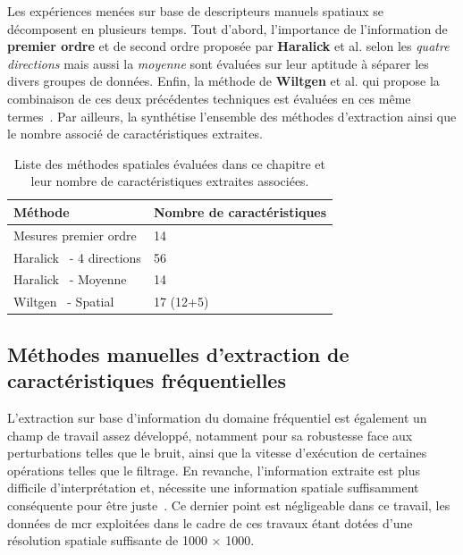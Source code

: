 Les expériences menées sur base de descripteurs manuels spatiaux se décomposent en plusieurs temps. Tout d'abord, l'importance de l'information de \textbf{premier ordre} et de second ordre proposée par \textbf{Haralick} et al. selon les \textit{quatre directions} mais aussi la \textit{moyenne} sont évaluées sur leur aptitude à séparer les divers groupes de données. Enfin, la méthode de \textbf{Wiltgen} et al. qui propose la combinaison de ces deux précédentes techniques est évaluées en ces même termes~\cite{Wiltgen2008}. Par ailleurs, la  synthétise l'ensemble des méthodes d'extraction ainsi que le nombre associé de caractéristiques extraites.\par
\begin{table}[h]
    \centering
    \begin{tabular}{ll}
        \toprule
        \textbf{Méthode}                            & \textbf{Nombre de caractéristiques}   \\ \hline
        Mesures premier ordre                       & 14                                    \\ \hline
        Haralick~\cite{Haralick1973} - 4 directions & 56                                    \\ \hline
        Haralick~\cite{Haralick1973} - Moyenne      & 14                                    \\ \hline
        Wiltgen~\cite{Wiltgen2008} - Spatial        & 17 (12+5)                             \\
        \bottomrule                 
    \end{tabular}
    \caption{Liste des méthodes spatiales évaluées dans ce chapitre et leur nombre de caractéristiques extraites associées.}
    \label{tab:number_features_spatial}
\end{table}
\clearpage

\subsection{Méthodes manuelles d'extraction de caractéristiques fréquentielles}
L'extraction sur base d'information du domaine fréquentiel est également un champ de travail assez développé, notamment pour sa robustesse face aux perturbations telles que le bruit, ainsi que la vitesse d'exécution de certaines opérations telles que le filtrage. En revanche, l'information extraite est plus difficile d'interprétation et, nécessite une information spatiale suffisamment conséquente pour être juste~\cite{Kamila2015}. Ce dernier point est négligeable dans ce travail, les données de \gls{mcr} exploitées dans le cadre de ces travaux étant dotées d'une résolution spatiale suffisante de \SI{1000}{\px} $\times$ \SI{1000}{\px}.\par

